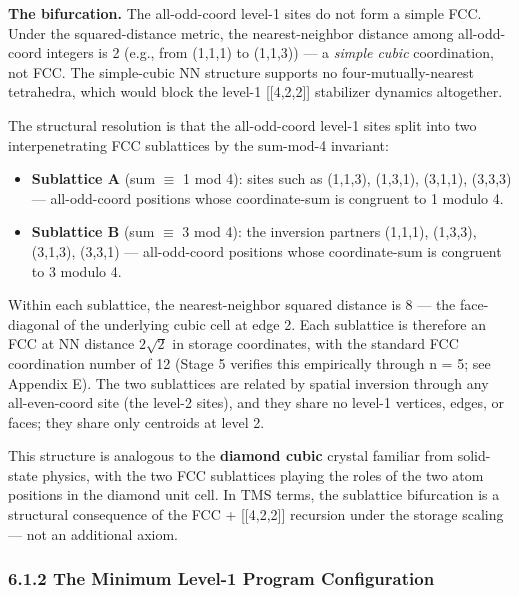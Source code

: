 \documentclass[11pt,oneside]{report}
\theoremstyle{definition}
\theoremstyle{remark}
\begin{document}
\textbf{The bifurcation.} The all-odd-coord level-1 sites do not form a
simple FCC. Under the squared-distance metric, the nearest-neighbor
distance among all-odd-coord integers is 2 (e.g., from (1,1,1) to
(1,1,3)) --- a \emph{simple cubic} coordination, not FCC. The
simple-cubic NN structure supports no four-mutually-nearest tetrahedra,
which would block the level-1 [[4,2,2]] stabilizer dynamics
altogether.

The structural resolution is that the all-odd-coord level-1 sites split
into two interpenetrating FCC sublattices by the sum-mod-4 invariant:

\begin{itemize}
\item
  \textbf{Sublattice A} (sum \ensuremath{\equiv} 1 mod 4): sites such as (1,1,3), (1,3,1),
  (3,1,1), (3,3,3) --- all-odd-coord positions whose coordinate-sum is
  congruent to 1 modulo 4.
\end{itemize}

\begin{itemize}
\item
  \textbf{Sublattice B} (sum \ensuremath{\equiv} 3 mod 4): the inversion partners (1,1,1),
  (1,3,3), (3,1,3), (3,3,1) --- all-odd-coord positions whose
  coordinate-sum is congruent to 3 modulo 4.
\end{itemize}

Within each sublattice, the nearest-neighbor squared distance is 8 ---
the face-diagonal of the underlying cubic cell at edge 2. Each
sublattice is therefore an FCC at NN distance \ensuremath{2\sqrt{2}} in storage
coordinates, with the standard FCC coordination number of 12 (Stage 5
verifies this empirically through n = 5; see Appendix E). The two
sublattices are related by spatial inversion through any all-even-coord
site (the level-2 sites), and they share no level-1 vertices, edges, or
faces; they share only centroids at level 2.

This structure is analogous to the \textbf{diamond cubic} crystal
familiar from solid-state physics, with the two FCC sublattices playing
the roles of the two atom positions in the diamond unit cell. In TMS
terms, the sublattice bifurcation is a structural consequence of the FCC
+ [[4,2,2]] recursion under the storage scaling --- not an
additional axiom.

\subsubsection*{6.1.2 The Minimum Level-1 Program Configuration}
\end{document}
